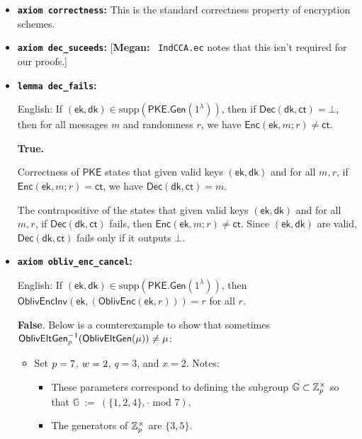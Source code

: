 \documentclass[11pt,letterpaper]{article}
\newcommand{\authnote}[2]{[{\color{red}\textbf{#1:}}~{\color{blue} #2}]}
\newcommand{\authnote}[2]{}
\newcommand{\megan}[1]{\authnote{Megan}{#1}}
\theoremstyle{plain} %
\theoremstyle{definition} %
\theoremstyle{remark} %
\newcommand{\code}[1]{\texttt{#1}} %
\newcommand{\eqdef}{\ {:=} \ }
\newcommand{\supp}{\textrm{supp}} %
\newcommand{\SecParam}{\lambda}
\newcommand{\PKE}{\mathsf{PKE}}
\newcommand{\Gen}{\mathsf{Gen}}
\newcommand{\Enc}{\mathsf{Enc}}
\newcommand{\OblivEnc}{\mathsf{OblivEnc}}
\newcommand{\OblivEncInv}{\mathsf{OblivEncInv}}
\newcommand{\Dec}{\mathsf{Dec}}
\newcommand{\EncKey}{\mathsf{ek}}
\newcommand{\DecKey}{\mathsf{dk}}
\newcommand{\Msg}{m}
\newcommand{\Ct}{\mathsf{ct}}
\newcommand{\Rand}{r}
\newcommand{\Integers}{\mathbb{Z}}
\newcommand{\Group}{\mathbb{G}}
\newcommand{\GrpOrd}{q}
\begin{document}
\renewcommand{\mod}{\textrm{ mod }}
\begin{itemize}
\item \textbf{\code{axiom correctness}:} This is the standard correctness property of encryption schemes.

\item \textbf{\code{axiom dec\_suceeds}:} \megan{\code{IndCCA.ec} notes that this isn't required for our proofs.}

\item \textbf{\code{lemma dec\_fails}:}

English: If $(\EncKey, \DecKey)\in \supp(\PKE.\Gen(1^{\SecParam}))$, then if $\Dec(\DecKey, \Ct) = \bot$, then for all messages $\Msg$ and randomness $\Rand$, we have $\Enc(\EncKey, \Msg; \Rand) \ne \Ct$.

\textbf{True.}

Correctness of $\PKE$ states that given valid keys $(\EncKey, \DecKey)$ and for all $\Msg, \Rand$, if $\Enc(\EncKey, \Msg; \Rand) = \Ct$, we have $\Dec(\DecKey, \Ct) = \Msg$.

The contrapositive of the states that given valid keys $(\EncKey, \DecKey)$ and for all $\Msg, \Rand$, if $\Dec(\DecKey, \Ct)$ fails, then $\Enc(\EncKey, \Msg; \Rand) \ne \Ct$. Since $(\EncKey, \DecKey)$ are valid, $\Dec(\DecKey, \Ct)$ fails only if it outputs $\bot$.


\item \textbf{\code{axiom obliv\_enc\_cancel}:}

English: If $(\EncKey, \DecKey)\in \supp(\PKE.\Gen(1^{\SecParam}))$, then $\OblivEncInv(\EncKey, (\OblivEnc(\EncKey, \Rand))) = \Rand$ for all $\Rand$.

\textbf{\color{red}False}. Below is a counterexample to show that sometimes ${\mathsf{OblivEltGen}}^{-1}_{p}(\mathsf{OblivEltGen}(\mu)) \ne \mu$:
\begin{itemize}[nolistsep]
    \item Set $p = 7$, $w = 2$, $\GrpOrd = 3$, and $x = 2$. Notes:
    \begin{itemize}[nolistsep]
        \item These parameters correspond to defining the subgroup $\Group \subset \MultGrp$ so that $\Group \eqdef (\{1,2,4\}, \cdot \mod 7)$.
        \item The generators of $\MultGrp$ are $\{3,5\}$.
    \end{itemize}


\end{itemize}
\end{itemize}
\end{document}
